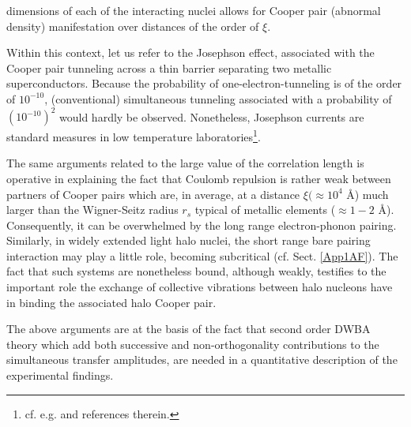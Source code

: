 dimensions of each of the interacting nuclei allows for  Cooper pair (abnormal density) manifestation over distances of the order of $\xi$.



Within this context, let us refer to the Josephson effect, associated with the Cooper pair tunneling across a thin barrier separating two metallic superconductors. Because the probability of one-electron-tunneling is of the order of $10^{-10}$, (conventional) simultaneous tunneling associated with a probability of $(10^{-10})^2$ would hardly be observed. Nonetheless, Josephson currents are standard measures in low temperature laboratories\footnote{cf. e.g. \cite{Rogalla:12} and references therein.}.


The same arguments related  to the large value of the correlation length is operative in explaining the fact that Coulomb repulsion is rather weak between partners of Cooper pairs which are, in average, at a distance $\xi (\approx 10^{4}$ \AA{}) much larger than the Wigner-Seitz radius $r_s$ typical of metallic elements ($\approx 1-2$ \AA{}). Consequently, it can be overwhelmed by the long range electron-phonon pairing. Similarly, in widely extended light halo nuclei, the short range bare pairing interaction may play a little role, becoming subcritical (cf. Sect. \ref{App1AF}). The fact that such systems are nonetheless bound, although weakly, testifies to the important role the exchange of collective vibrations between halo nucleons have in binding the associated halo Cooper pair.


The above arguments are at the basis of the fact that second order DWBA theory which add both successive and non-orthogonality contributions to the simultaneous transfer amplitudes, are needed in a quantitative description of the experimental findings.

